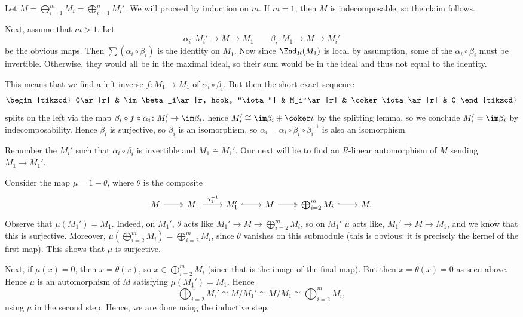 Let $M = \bigoplus_{i=1}^m M_i = \bigoplus_{i = 1}^n M_i'$. We will proceed by
induction on $m$. If $m = 1$, then $M$ is indecomposable, so the claim follows.

Next, assume that $m>1$. Let
\[ \alpha_i\colon M_i'\to M\to M_1\qquad \beta_i\colon M_1\to M\to M_i' \]
be the obvious maps. Then $\sum (\alpha_i \circ \beta_i)$ is the identity on $M_1$.
Now since $\End_R(M_1)$ is local by assumption, some of the $\alpha_i \circ \beta_i$
must be invertible. Otherwise, they would all be in the maximal ideal, so
their sum would be in the ideal and thus not equal to the identity.

This means that we find a left inverse $f\colon M_1 \to M_1$ of $\alpha_i \circ \beta_i$.
But then the short exact sequence
\[\begin{tikzcd}
	0\ar[r] & \im \beta_i\ar[r, hook, "\iota"] & M_i'\ar[r] & \coker\iota\ar[r] & 0
\end{tikzcd}\]
splits on the left via the map $\beta_i \circ f \circ \alpha_i\colon M_i'\to \im\beta_i$,
hence $M_i'\cong \im\beta_i\oplus \coker \iota$ by the splitting lemma, so we conclude $M_i' = \im\beta_i$
by indecomposability. Hence $\beta_i$ is surjective, so $\beta_i$ is an isomorphism,
so $\alpha_i = \alpha_i \circ \beta_i \circ \beta_i^{-1}$ is also an isomorphism.

Renumber the $M_i'$ such that $\alpha_i \circ \beta_i$ is invertible and
$M_1\cong M_1'$. Our next will be to find an $R$-linear automorphism of $M$ sending
$M_1\to M_1'$.

Consider the map $\mu = 1 - \theta$, where $\theta$ is the composite
\[\begin{tikzcd}
	M\ar[r, two heads] & M_1\ar[r, "\alpha_1^{-1}"] & M_1'\ar[r, hook] & M\ar[r, two heads] & \bigoplus_{i = 2}^m M_i\ar[r, hook] & M.
\end{tikzcd}\]
Observe that $\mu(M_1') = M_1$. Indeed, on $M_1'$, $\theta$ acts like
$M_1' \to M \to \bigoplus_{i=2}^m M_i$, so on $M_1'$ $\mu$ acts like,
$M_1'\to M\to M_1$, and we know that this is surjective.
Moreover, $\mu(\bigoplus_{i=2}^m M_i) = \bigoplus_{i=2}^m M_i$, since $\theta$
vanishes on this submodule (this is obvious: it is precisely the kernel of
the first map).
This shows that $\mu$ is surjective.

Next, if $\mu(x) = 0$, then $x = \theta(x)$, so $x \in \bigoplus_{i=2}^m M_i$ (since
that is the image of the final map). But then $x = \theta(x) = 0$ as seen above.
Hence $\mu$ is an automorphism of $M$ satisfying $\mu(M_1') = M_1$. Hence
\[\bigoplus_{i = 2}^n M_i' \cong M/M_1' \cong M/M_1 \cong \bigoplus_{i=2}^m M_i, \]
using $\mu$ in the second step. Hence, we are done using the inductive step.
